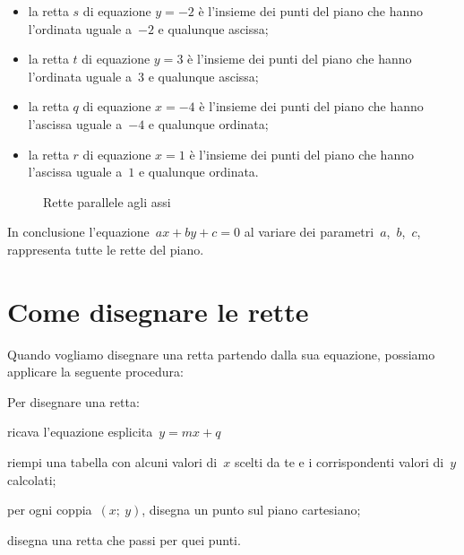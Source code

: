 \begin{itemize} [noitemsep]
 \item la retta \(s\) di equazione \(y=-2\) è l'insieme dei punti del piano 
  che hanno l'ordinata uguale a~\(-2\) e qualunque ascissa;
 \item la retta \(t\) di equazione \(y=3\) è l'insieme dei punti del piano 
  che hanno l'ordinata uguale a~\(3\) e qualunque ascissa;
 \item la retta \(q\) di equazione \(x=-4\) è l'insieme dei punti del piano 
  che hanno l'ascissa uguale a~\(-4\) e qualunque ordinata;
 \item la retta \(r\) di equazione \(x=1\) è l'insieme dei punti del piano 
  che hanno l'ascissa uguale a~\(1\) e qualunque ordinata.
\end{itemize}

\begin{inaccessibleblock}
 \begin{figure}[h]
 \begin{minipage}[]{.50\textwidth}
\rettey
 \end{minipage}
 \begin{minipage}[]{.40\textwidth}
\rettex
 \end{minipage}
  \caption{Rette parallele agli assi}\label{fig:rette_p_assi}
\end{figure}
\end{inaccessibleblock}

In conclusione l'equazione~\(ax + by + c = 0\) al variare dei 
parametri~\(a\),~\(b\),~\(c\), rappresenta tutte le rette del piano.

\section{Come disegnare le rette}
\label{sec:retta_disegno}

Quando vogliamo disegnare una retta partendo dalla sua equazione, possiamo
applicare la seguente procedura:

\begin{procedura}
 Per disegnare una retta:
 \begin{enumeratea}
  \item ricava l'equazione esplicita~\(y=mx+q\)
  \item riempi una tabella con alcuni valori di~\(x\) scelti da te e i 
   corrispondenti valori di~\(y\) calcolati;
  \item per ogni coppia~\((x;~y)\), disegna un punto sul piano cartesiano;
  \item disegna una retta che passi per quei punti.
 \end{enumeratea}
\end{procedura}


